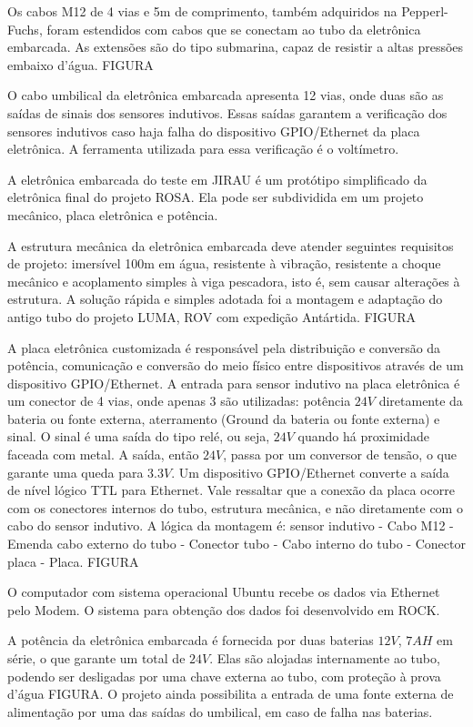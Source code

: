 Os cabos M12 de 4 vias e 5m de comprimento, também adqui\-ridos na
Pepperl-Fuchs, foram estendidos com cabos que se conectam ao tubo da
eletrô\-nica embarcada. As extensões são do tipo submarina, capaz de re\-sistir a altas pressões embaixo
d'água. FIGURA

O cabo umbilical da eletrônica embarcada apresenta 12 vias, onde duas são as
saídas de sinais dos sensores indutivos. Essas saídas garantem a
verificação dos sensores indutivos caso haja falha do dispositivo GPIO/Ethernet
da placa eletrônica. A ferramenta utilizada para essa verificação é o
voltímetro.

A eletrônica embarcada do teste em JIRAU é um protótipo simplificado da
eletrônica final do projeto ROSA. Ela pode ser subdividida em um projeto
mecânico, placa eletrônica e potência. 

A estrutura mecânica da eletrônica embarcada deve atender seguintes requisitos
de projeto: imersível 100m em água, resistente à vibração, resistente a choque
mecânico e acoplamento simples à viga pescadora, isto é, sem causar alterações à
estrutura. A solução rápida e simples adotada foi a montagem e adaptação do
antigo tubo do projeto LUMA, ROV com expedição Antártida. FIGURA

A placa eletrônica customizada é responsável pela distribuição e conversão da
potência, comunicação e conversão do meio físico entre dispositivos através de
um dispositivo GPIO/Ethernet. A entrada para sensor indutivo na placa eletrônica
é um conector de 4 vias, onde apenas 3 são utilizadas: potência $24V$
diretamente da bateria ou fonte externa, aterramento (Ground da bateria ou fonte
externa) e sinal. O sinal é uma saída do tipo relé, ou seja, $24V$ quando há
proximidade faceada com metal. A saída, então $24V$, passa por um conversor de
tensão, o que garante uma queda para $3.3V$. Um dispositivo GPIO/Ethernet
converte a saída de nível lógico TTL para Ethernet. Vale ressaltar que a
conexão da placa ocorre com os conectores internos do tubo, estrutura mecânica, e não diretamente com o cabo do sensor indutivo. A lógica da montagem é: sensor indutivo - Cabo
M12 - Emenda cabo externo do tubo - Conector tubo - Cabo interno do tubo -
Conector placa - Placa. FIGURA

O computador com sistema operacional Ubuntu recebe os dados via Ethernet pelo
Modem. O sistema para obtenção dos dados foi desenvolvido em ROCK.

A potência da eletrônica embarcada é fornecida por duas baterias $12V$, $7AH$ em
série, o que garante um total de $24V$. Elas são alojadas internamente ao tubo,
podendo ser desligadas por uma chave externa ao tubo, com proteção à prova
d'água FIGURA. O projeto ainda possibilita a entrada de uma fonte externa de
alimentação por uma das saídas do umbilical, em caso de falha nas baterias.

